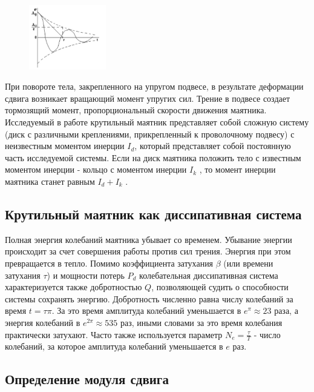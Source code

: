 \documentclass[a4paper,12pt]{report}
\begin{document}
\begin{figure}
    \includegraphics[width=0.3\textwidth]{graph.jpg}
    \label{ris:image}
\end{figure}

При повороте тела, закрепленного на упругом подвесе, в результате деформации сдвига возникает вращающий момент упругих сил. 
Трение в подвесе создает тормозящий момент, пропорциональный скорости движения маятника.
Исследуемый в работе крутильный маятник представляет собой сложную систему (диск с различными креплениями, прикрепленный к проволочному подвесу) с неизвестным моментом инерции $I_d$, 
который представляет собой постоянную часть исследуемой системы. Если на диск маятника положить тело с известным моментом инерции - кольцо с моментом инерции $I_k$ , то момент инерции маятника станет равным $I_d+I_k$ . 

\subsection*{Крутильный маятник как диссипативная система}

Полная энергия колебаний маятника убывает со временем. 
Убывание энергии происходит за счет совершения работы против сил трения. 
Энергия при этом превращается в тепло. 
Помимо коэффициента затухания $\beta$ (или времени затухания $\tau$) и мощности потерь $P_d$ колебательная диссипативная система характеризуется также добротностью $Q$, 
позволяющей судить о способности системы сохранять энергию. 
Добротность численно равна числу колебаний за время $t = \tau\pi$. 
За это время амплитуда колебаний уменьшается в $e^{\pi} \approx 23$ раза, 
а энергия колебаний в $e^{2\pi} \approx 535$ раз, иными словами за это время колебания практически затухают. 
Часто также используется параметр $N_e = \frac{\tau}{T}$ - число колебаний, за которое амплитуда колебаний уменьшается в $e$ раз. 

\newpage
\subsection*{Определение модуля сдвига}
\end{document}

